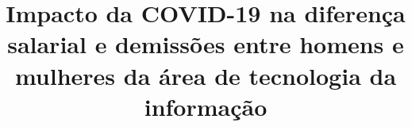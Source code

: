 \title{Impacto da COVID-19 na diferença salarial e demissões entre homens e mulheres da área de tecnologia da informação \\
}